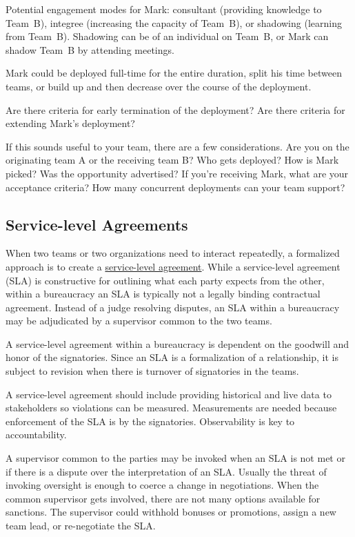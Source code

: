 Potential engagement modes for Mark: consultant (providing knowledge to Team~B), integree (increasing the capacity of Team~B), or shadowing (learning from Team~B). Shadowing can be of an individual on Team~B, or Mark can shadow Team~B by attending meetings. 


Mark could be deployed full-time for the entire duration, split his time between teams, or build up and then decrease over the course of the deployment.

Are there criteria for early termination of the deployment? Are there criteria for extending Mark's deployment?

If this sounds useful to your team, there are a few considerations. Are you on the originating team A or the receiving team B? Who gets deployed? How is Mark picked? Was the opportunity advertised? If you're receiving Mark, what are your acceptance criteria? How many concurrent deployments can your team support?


\subsection*{Service-level Agreements\label{sec:sla}}

When two teams or two organizations need to interact repeatedly, a formalized approach is to create a \href{https://en.wikipedia.org/wiki/Service-level_agreement}{service-level agreement}. 
While a service-level agreement (SLA) is constructive for outlining what each party expects from the other, within a bureaucracy an SLA is typically not a legally binding contractual agreement. Instead of a judge resolving disputes, an SLA within a bureaucracy may be adjudicated by a supervisor common to the two teams.

A service-level agreement within a bureaucracy is dependent on the goodwill and honor of the signatories. Since an SLA is a formalization of a relationship, it is subject to revision when there is turnover of signatories in the teams. 

A service-level agreement should include providing historical and live data to stakeholders so violations can be measured. Measurements are needed because enforcement of the SLA is by the signatories. Observability is key to accountability. 

A supervisor common to the parties may be invoked when an SLA is not met or if there is a dispute over the interpretation of an SLA. Usually the threat of invoking oversight is enough to coerce a change in negotiations. 
When the common supervisor gets involved, there are not many options available for sanctions. The supervisor could withhold bonuses or promotions,  assign a new team lead, or re-negotiate the SLA. 

